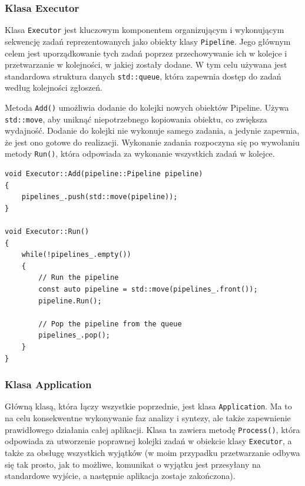 \subsubsection{Klasa Executor}

Klasa \texttt{Executor} jest kluczowym komponentem organizującym i wykonującym sekwencję zadań reprezentowanych jako obiekty klasy \texttt{Pipeline}. Jego głównym celem jest uporządkowanie tych zadań poprzez przechowywanie ich w kolejce i przetwarzanie w kolejności, w jakiej zostały dodane. W tym celu używana jest standardowa struktura danych \texttt{std::queue}, która zapewnia dostęp do zadań według kolejności zgłoszeń.

Metoda \texttt{Add()} umożliwia dodanie do kolejki nowych obiektów Pipeline. Używa \texttt{std::move}, aby uniknąć niepotrzebnego kopiowania obiektu, co zwiększa wydajność. Dodanie do kolejki nie wykonuje samego zadania, a jedynie zapewnia, że jest ono gotowe do realizacji. Wykonanie zadania rozpoczyna się po wywołaniu metody \texttt{Run()}, która odpowiada za wykonanie wszystkich zadań w kolejce.

\begin{lstlisting}[label=list:executor,caption=Implementacja klasy Executor,basicstyle=\footnotesize\ttfamily]
void Executor::Add(pipeline::Pipeline pipeline)
{
	pipelines_.push(std::move(pipeline));
}

void Executor::Run()
{
	while(!pipelines_.empty())
	{
		// Run the pipeline
		const auto pipeline = std::move(pipelines_.front());
		pipeline.Run();

		// Pop the pipeline from the queue
		pipelines_.pop();
	}
}
\end{lstlisting}

\subsubsection{Klasa Application}

Główną klasą, która łączy wszystkie poprzednie, jest klasa \texttt{Application}. Ma to na celu konsekwentne wykonywanie faz analizy i syntezy, ale także zapewnienie prawidłowego działania całej aplikacji. Klasa ta zawiera metodę \texttt{Process()}, która odpowiada za utworzenie poprawnej kolejki zadań w obiekcie klasy \texttt{Executor}, a także za obsługę wszystkich wyjątków (w moim przypadku przetwarzanie odbywa się tak prosto, jak to możliwe, komunikat o wyjątku jest przesyłany na standardowe wyjście, a następnie aplikacja zostaje zakończona).

